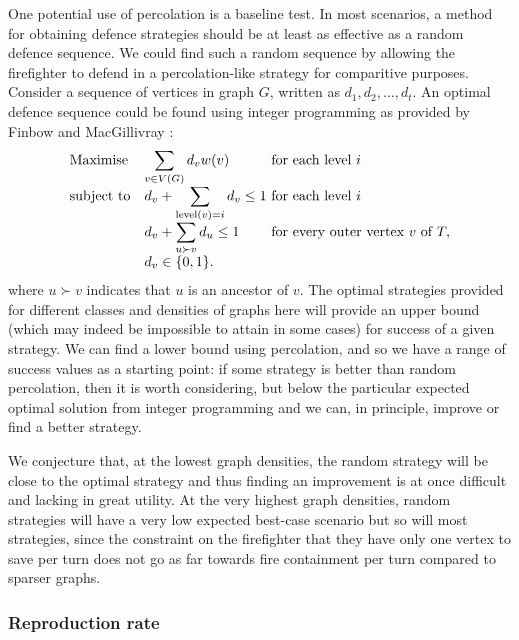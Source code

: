 \documentclass[../report.tex]{subfiles}
\begin{document}
One potential use of percolation is a baseline test. In most scenarios, a method for obtaining defence strategies should be at least as effective as a random defence sequence. We could find such a random sequence by allowing the firefighter to defend in a percolation-like strategy for comparitive purposes. Consider a sequence of vertices in graph $G$, written as $d_1, d_2,\dots, d_t$. An optimal defence sequence could be found using integer programming as provided by Finbow and MacGillivray \cite{finbow_2009}:
\begin{equation*}
	\begin{array}{ll@{}ll}
\text{Maximise}  & \displaystyle \sum\limits_{v\in V(G)} d_v w(v) &\text{~for each level~} i\\
\text{subject to}& d_v + \displaystyle\sum\limits_{\text{level}(v)=i} d_v \leq 1  &\text{~for each level~} i\\
				 & d_v + \displaystyle\sum\limits_{u\succ v}  d_u \leq 1  &\text{~for every outer vertex~} v \text{~of~} T,\\
                 &d_{v} \in \{0,1\}. &
	\end{array}
\end{equation*}
where $u\succ v$ indicates that $u$ is an ancestor of $v$. The optimal strategies provided for different classes and densities of graphs here will provide an upper bound (which may indeed be impossible to attain in some cases) for success of a given strategy. We can find a lower bound using percolation, and so we have a range of success values as a starting point: if some strategy is better than random percolation, then it is worth considering, but below the particular expected optimal solution from integer programming and we can, in principle, improve or find a better strategy.

We conjecture that, at the lowest graph densities, the random strategy will be close to the optimal strategy and thus finding an improvement is at once difficult and lacking in great utility. At the very highest graph densities, random strategies will have a very low expected best-case scenario but so will most strategies, since the constraint on the firefighter that they have only one vertex to save per turn does not go as far towards fire containment per turn compared to sparser graphs.

\subsubsection{Reproduction rate}
\end{document}
